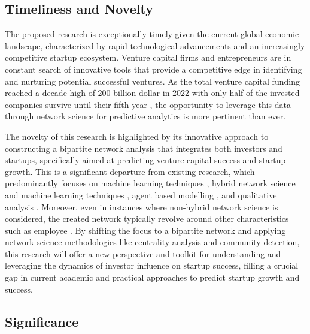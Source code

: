 \documentclass[a4paper,11pt]{article}
\begin{document}
\subsection{Timeliness and Novelty}

The proposed research is exceptionally timely given the current global economic landscape, characterized by rapid technological advancements and an increasingly competitive startup ecosystem. Venture capital firms and entrepreneurs are in constant search of innovative tools that provide a competitive edge in identifying and nurturing potential successful ventures. As the total venture capital funding reached a decade-high of 200 billion dollar in 2022 \cite{embroker2024a} with only half of the invested companies survive until their fifth year \cite{kotashev2024a}, the opportunity to leverage this data through network science for predictive analytics is more pertinent than ever.

The novelty of this research is highlighted by its innovative approach to constructing a bipartite network analysis that integrates both investors and startups, specifically aimed at predicting venture capital success and startup growth. This is a significant departure from existing research, which predominantly focuses on machine learning techniques \cite{krishna2016a} \cite{sharchilev2018a}, hybrid network science and machine learning techniques \cite{carniel2023a} \cite{yang2020a}, agent based modelling \cite{lengyel2020a}, and qualitative analysis \cite{mccarthy2023a}. Moreover, even in instances where non-hybrid network science is considered, the created network typically revolve around other characteristics such as employee \cite{bonaventura2020a}. By shifting the focus to a bipartite network and applying network science methodologies like centrality analysis and community detection, this research will offer a new perspective and toolkit for understanding and leveraging the dynamics of investor influence on startup success, filling a crucial gap in current academic and practical approaches to predict startup growth and success.

\subsection{Significance}
\end{document}
